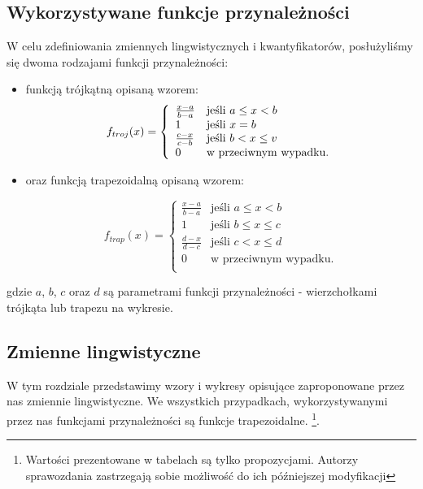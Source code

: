 \documentclass{classrep}
\begin{document}
\subsection{Wykorzystywane funkcje przynależności}

W celu zdefiniowania zmiennych lingwistycznych i kwantyfikatorów, posłużyliśmy się dwoma rodzajami funkcji przynależności:

\begin{itemize}[label=$\bullet$\scshape\bfseries]
\item funkcją trójkątną opisaną wzorem:
\begin{equation}
{f}_{troj}(x)= \left\{ \begin{array}{ll}
\frac{x-a}{b-a} 	& \textrm{jeśli $a \leq x < b$} \\
1 			& \textrm{jeśli $ x = b $} \\
\frac{c-x}{c-b} 	& \textrm{jeśli $b < x \leq v$} \\
0 			& \textrm{w przeciwnym wypadku.} \\
\end{array} \right.
\end{equation}


\item oraz funkcją trapezoidalną opisaną wzorem:

\begin{equation}
{f}_{trap}(x)= \left\{ \begin{array}{ll}
\frac{x-a}{b-a} 	& \textrm{jeśli $a \leq x < b$} \\
1 			& \textrm{jeśli $b \leq x \leq c$} \\
\frac{d-x}{d-c} 	& \textrm{jeśli $c < x \leq d$} \\
0 			& \textrm{w przeciwnym wypadku.} \\
\end{array} \right.
\end{equation}


\end{itemize}


gdzie $a$, $b$, $c$ oraz $d$ są parametrami funkcji przynależności - wierzchołkami trójkąta lub trapezu na wykresie. \newline\newline




\subsection{Zmienne lingwistyczne}
W tym rozdziale przedstawimy wzory i wykresy opisujące zaproponowane przez nas zmiennie lingwistyczne. We wszystkich przypadkach, wykorzystywanymi przez nas funkcjami przynależności są funkcje trapezoidalne.  \footnote{Wartości prezentowane w tabelach są tylko propozycjami. Autorzy sprawozdania zastrzegają sobie możliwość do ich późniejszej modyfikacji}.\newline
\end{document}
